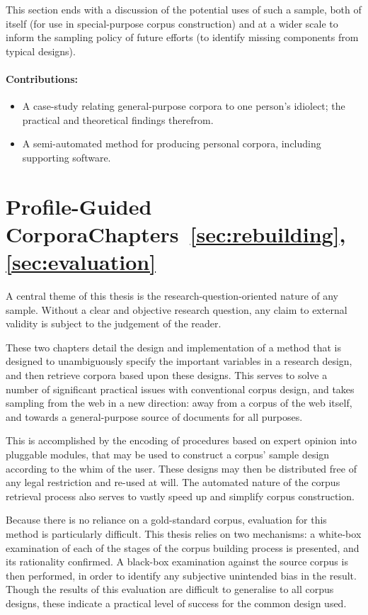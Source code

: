 This section ends with a discussion of the potential uses of such a sample, both of itself (for use in special-purpose corpus construction) and at a wider scale to inform the sampling policy of future efforts (to identify missing components from typical designs).

\paragraph{Contributions:}
\begin{itemize}
    \item A case-study relating general-purpose corpora to one person's idiolect; the practical and theoretical findings therefrom.
    \item A semi-automated method for producing personal corpora, including supporting software.
\end{itemize}


\section*{Profile-Guided Corpora\hfill{}Chapters~\ref{sec:rebuilding},~\ref{sec:evaluation}}
A central theme of this thesis is the research-question-oriented nature of any sample.  Without a clear and objective research question, any claim to external validity is subject to the judgement of the reader.

These two chapters detail the design and implementation of a method that is designed to unambiguously specify the important variables in a research design, and then retrieve corpora based upon these designs.  This serves to solve a number of significant practical issues with conventional corpus design, and takes sampling from the web in a new direction: away from a corpus of the web itself, and towards a general-purpose source of documents for all purposes.

This is accomplished by the encoding of procedures based on expert opinion into pluggable modules, that may be used to construct a corpus' sample design according to the whim of the user.  These designs may then be distributed free of any legal restriction and re-used at will.  The automated nature of the corpus retrieval process also serves to vastly speed up and simplify corpus construction.

Because there is no reliance on a gold-standard corpus, evaluation for this method is particularly difficult.  This thesis relies on two mechanisms: a white-box examination of each of the stages of the corpus building process is presented, and its rationality confirmed.  A black-box examination against the source corpus is then performed, in order to identify any subjective unintended bias in the result.  Though the results of this evaluation are difficult to generalise to all corpus designs, these indicate a practical level of success for the common design used.

